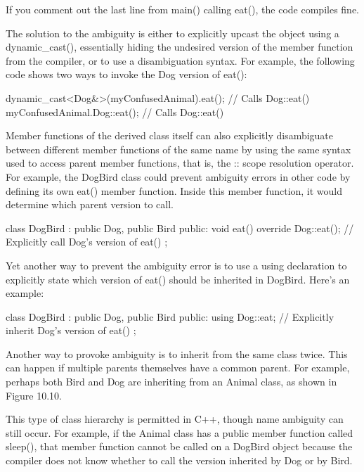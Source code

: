 If you comment out the last line from main() calling eat(), the code compiles fine.

The solution to the ambiguity is either to explicitly upcast the object using a dynamic\_cast(), essentially hiding the undesired version of the member function from the compiler, or to use a disambiguation syntax. For example, the following code shows two ways to invoke the Dog version of eat():

\begin{cpp}
dynamic_cast<Dog&>(myConfusedAnimal).eat(); // Calls Dog::eat()
myConfusedAnimal.Dog::eat(); // Calls Dog::eat()
\end{cpp}

Member functions of the derived class itself can also explicitly disambiguate between different member functions of the same name by using the same syntax used to access parent member functions, that is, the :: scope resolution operator. For example, the DogBird class could prevent ambiguity errors in other code by defining its own eat() member function. Inside this member function, it would determine which parent version to call.

\begin{cpp}
class DogBird : public Dog, public Bird
{
    public:
        void eat() override
        {
            Dog::eat(); // Explicitly call Dog's version of eat()
        }
};
\end{cpp}

Yet another way to prevent the ambiguity error is to use a using declaration to explicitly state which version of eat() should be inherited in DogBird. Here’s an example:

\begin{cpp}
class DogBird : public Dog, public Bird
{
    public:
        using Dog::eat; // Explicitly inherit Dog's version of eat()
};
\end{cpp}


Another way to provoke ambiguity is to inherit from the same class twice. This can happen if multiple parents themselves have a common parent. For example, perhaps both Bird and Dog are inheriting from an Animal class, as shown in Figure 10.10.


This type of class hierarchy is permitted in C++, though name ambiguity can still occur. For example, if the Animal class has a public member function called sleep(), that member function cannot be called on a DogBird object because the compiler does not know whether to call the version inherited by Dog or by Bird.

